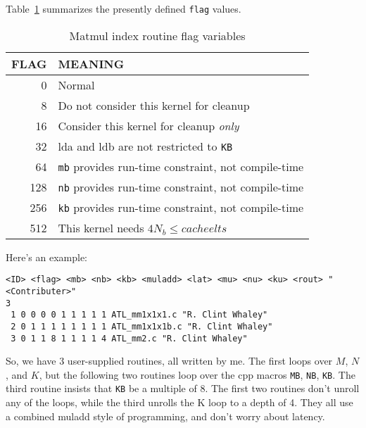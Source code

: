 \documentclass[11pt]{article}
\begin{document}
Table~\ref{tab-mmflag} summarizes the presently defined {\tt flag} values.\\
\begin{table}[h!]
\begin{center}
\begin{tabular}{||r|l||}\hline\hline
FLAG & MEANING \\\hline\hline
   0 & Normal \\\hline
   8 & Do not consider this kernel for cleanup\\\hline
  16 & Consider this kernel for cleanup {\em only}\\\hline 
  32 & lda and ldb are not restricted to {\tt KB} \\\hline 
  64 & {\tt mb} provides run-time constraint, not compile-time\\\hline 
 128 & {\tt nb} provides run-time constraint, not compile-time\\\hline 
 256 & {\tt kb} provides run-time constraint, not compile-time\\\hline 
 512 & This kernel needs $4 N_b \le cacheelts$\\\hline
  \hline
\end{tabular}
\end{center}
\caption{Matmul index routine flag variables\label{tab-mmflag}}
\end{table}

Here's an example:
\begin{verbatim}
<ID> <flag> <mb> <nb> <kb> <muladd> <lat> <mu> <nu> <ku> <rout> "<Contributer>"
3
 1 0 0 0 0 1 1 1 1 1 ATL_mm1x1x1.c "R. Clint Whaley"
 2 0 1 1 1 1 1 1 1 1 ATL_mm1x1x1b.c "R. Clint Whaley"
 3 0 1 1 8 1 1 1 1 4 ATL_mm2.c "R. Clint Whaley"
\end{verbatim}

So, we have 3 user-supplied routines, all written by me.  The first loops
over $M$, $N$, and $K$, but the following two routines loop over the cpp
macros {\tt MB}, {\tt NB}, {\tt KB}.  The third routine insists that
{\tt KB} be a multiple of 8.  The first two routines don't unroll
any of the loops, while the third unrolls the K loop to a depth of 4.
They all use a combined muladd style of programming, and don't worry
about latency.
\end{document}
